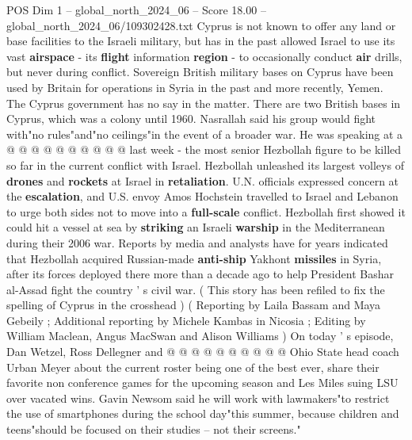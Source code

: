 \begin{textsample}{POS Dim 1 – global\_north\_2024\_06 – Score 18.00 – global\_north\_2024\_06/109302428.txt}
Cyprus is not known to offer any land or base facilities to the Israeli military, but has in the past allowed Israel to use its vast \textbf{airspace} - its \textbf{flight} information \textbf{region} - to occasionally conduct \textbf{air} drills, but never during conflict.
Sovereign British military bases on Cyprus have been used by Britain for operations in Syria in the past and more recently, Yemen.
The Cyprus government has no say in the matter.
There are two British bases in Cyprus, which was a colony until 1960.
Nasrallah said his group would fight with"no rules"and"no ceilings"in the event of a broader war.
He was speaking at a @ @ @ @ @ @ @ @ @ @ last week - the most senior Hezbollah figure to be killed so far in the current conflict with Israel.
Hezbollah unleashed its largest volleys of \textbf{drones} and \textbf{rockets} at Israel in \textbf{retaliation}.
U.N. officials expressed concern at the \textbf{escalation}, and U.S. envoy Amos Hochstein travelled to Israel and Lebanon to urge both sides not to move into a \textbf{full-scale} conflict.
Hezbollah first showed it could hit a vessel at sea by \textbf{striking} an Israeli \textbf{warship} in the Mediterranean during their 2006 war.
Reports by media and analysts have for years indicated that Hezbollah acquired Russian-made \textbf{anti-ship} Yakhont \textbf{missiles} in Syria, after its forces deployed there more than a decade ago to help President Bashar al-Assad fight the country ' s civil war. ( This story has been refiled to fix the spelling of Cyprus in the crosshead ) ( Reporting by Laila Bassam and Maya Gebeily ; Additional reporting by Michele Kambas in Nicosia ; Editing by William Maclean, Angus MacSwan and Alison Williams ) On today ' s episode, Dan Wetzel, Ross Dellegner and @ @ @ @ @ @ @ @ @ @ Ohio State head coach Urban Meyer about the current roster being one of the best ever, share their favorite non conference games for the upcoming season and Les Miles suing LSU over vacated wins.
Gavin Newsom said he will work with lawmakers"to restrict the use of smartphones during the school day"this summer, because children and teens"should be focused on their studies -- not their screens."

\end{textsample}
